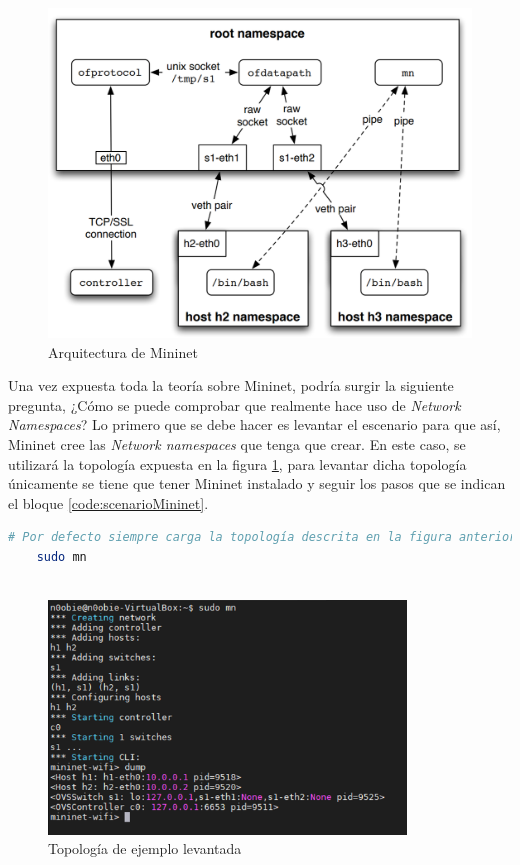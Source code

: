 \begin{figure}[ht]
    \centering
    \includegraphics[width=11.5cm]{archivos/img/teoria/mn_arch.png}
    \caption{Arquitectura de Mininet \cite{heller2013reproducible}}
    \label{fig:mininet_arch}
\end{figure}

Una vez expuesta toda la teoría sobre Mininet, podría surgir la siguiente pregunta, ¿Cómo se puede comprobar que realmente hace uso de \textit{Network Namespaces}? Lo primero que se debe hacer es levantar el escenario para que así, Mininet cree las \textit{Network namespaces} que tenga que crear. En este caso, se utilizará la topología expuesta en la figura \ref{fig:mininet_arch}, para levantar dicha topología únicamente se tiene que tener Mininet instalado y seguir los pasos que se indican el bloque \ref{code:scenarioMininet}.


\begin{lstlisting}[language= bash, style=Consola, caption={Levantamiento de la topología de ejemplo},label=code:scenarioMininet]
    # Por defecto siempre carga la topología descrita en la figura anterior
    sudo mn
    
\end{lstlisting}
\vspace{0.5cm}

\begin{figure}[ht]
    \centering
    \includegraphics[width=9.5cm]{archivos/img/teoria/mn_01.png}
    \caption{Topología de ejemplo levantada}
    \label{fig:mininet_01}
\end{figure}

